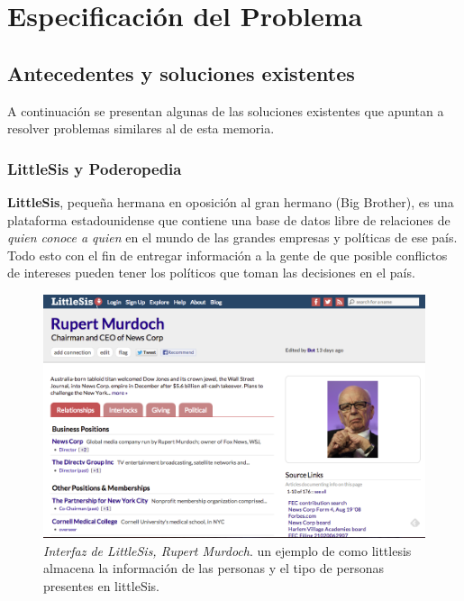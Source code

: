 \chapter{Especificación del Problema}

\section{Antecedentes y soluciones existentes} %
\label{sec:antecedentes_y_soluciones_existentes}

A continuación se presentan algunas de las soluciones existentes que apuntan a resolver problemas similares al de esta memoria.

\subsection{LittleSis y Poderopedia} %
\label{sub:littlesis_y_poderopedia}

\textbf{LittleSis}, pequeña hermana en oposición al gran hermano (Big Brother), es una plataforma estadounidense que contiene una base de datos libre de relaciones de \emph{quien conoce a quien} en el mundo de las grandes empresas y políticas de ese país. Todo esto con el fin de entregar información a la gente de que posible conflictos de intereses pueden tener los políticos que toman las decisiones en el país.

\begin{figure}[H]
  \includegraphics[width=1.0\textwidth]{images/littlesis.png}
  \caption[Interfaz de LittleSis, Rupert Murdoch]{\emph{Interfaz de LittleSis, Rupert Murdoch}. un ejemplo de como littlesis almacena la información de las personas y el tipo de personas presentes en littleSis.}
  \label{ejemplo_littlesis}
\end{figure}

